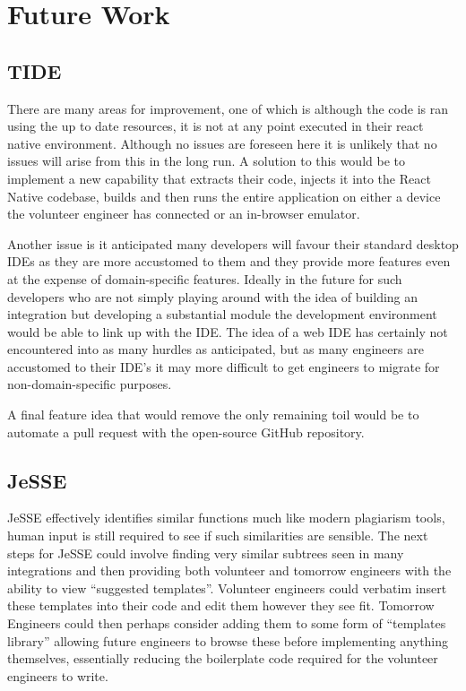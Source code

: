 \documentclass[jou,apacite]{apa6}
\begin{document}
\section{Future Work}
\subsection{TIDE}
There are many areas for improvement, one of which is although the code is ran using the up to date resources, it is not at any point executed in their react native environment. Although no issues are foreseen here it is unlikely that no issues will arise from this in the long run. A solution to this would be to implement a new capability that extracts their code, injects it into the React Native codebase, builds and then runs the entire application on either a device the volunteer engineer has connected or an in-browser emulator. 

Another issue is it anticipated many developers will favour their standard desktop IDEs as they are more accustomed to them and they provide more features even at the expense of domain-specific features. Ideally in the future for such developers who are not simply playing around with the idea of building an integration but developing a substantial module the development environment would be able to link up with the IDE. The idea of a web IDE has certainly not encountered into as many hurdles as anticipated, but as many engineers are accustomed to their IDE's it may more difficult to get engineers to migrate for non-domain-specific purposes. 

A final feature idea that would remove the only remaining toil would be to automate a pull request with the open-source GitHub repository.

\subsection{JeSSE}
 JeSSE effectively identifies similar functions much like modern plagiarism tools, human input is still required to see if such similarities are sensible. The next steps for JeSSE could involve finding very similar subtrees seen in many integrations and then providing both volunteer and tomorrow engineers with the ability to view “suggested templates”. Volunteer engineers could verbatim insert these templates into their code and edit them however they see fit.  Tomorrow Engineers could then perhaps consider adding them to some form of “templates library” allowing future engineers to browse these before implementing anything themselves, essentially reducing the boilerplate code required for the volunteer engineers to write. 
\end{document}
